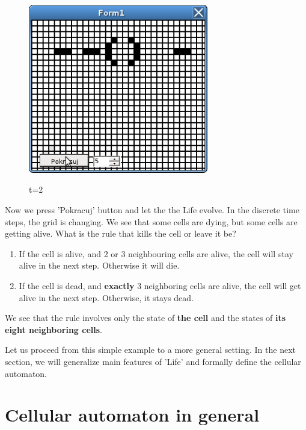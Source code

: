 \begin{figure}
 \centering
 \includegraphics[width=0.7\textwidth]{./img/gol3}
 \label{gol2}
 \caption{t=2}
\end{figure}

Now we press 'Pokracuj' button and let the the Life evolve.
In the discrete time steps, the grid is changing.
We see that some cells are dying, but some cells are getting alive. 
What is the rule that kills the cell or leave it be? 

\begin{enumerate}
\item If the cell is alive, and 2 or 3 neighbouring cells are alive, the cell will stay alive in the next step. Otherwise it will die.
\item If the cell is dead, and \textbf{exactly} 3 neighboring cells are alive, the cell will get alive in the next step. Otherwise, it stays dead.

\end{enumerate}
We see that the rule involves only the state of \textbf{the cell} and the states of \textbf{its eight neighboring cells}.

\bigskip


Let us proceed from this simple example to a more general setting.
In the next section, we will generalize main features of 'Life' and formally define the cellular automaton.

\section{Cellular automaton in general}


